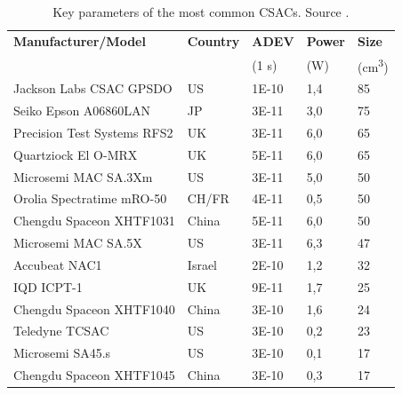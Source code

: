 \begin{table}[H]
    \centering
    \begin{tabular}{l|llll}
        \hline
        \textbf{Manufacturer/Model} & \textbf{Country} & \textbf{ADEV} & \textbf{Power} & \textbf{Size}           \\
        ~                           & ~                & (1 s)         & (W)            & (cm\textsuperscript{3}) \\
        \hline
        Jackson Labs CSAC GPSDO     & US               & 1E-10         & 1,4            & 85                      \\
        Seiko Epson A06860LAN       & JP               & 3E-11         & 3,0            & 75                      \\
        Precision Test Systems RFS2 & UK               & 3E-11         & 6,0            & 65                      \\
        Quartziock El O-MRX         & UK               & 5E-11         & 6,0            & 65                      \\
        Microsemi MAC SA.3Xm        & US               & 3E-11         & 5,0            & 50                      \\
        Orolia Spectratime mRO-50   & CH/FR            & 4E-11         & 0,5            & 50                      \\
        Chengdu Spaceon XHTF1031    & China            & 5E-11         & 6,0            & 50                      \\
        Microsemi MAC SA.5X         & US               & 3E-11         & 6,3            & 47                      \\
        Accubeat NAC1               & Israel           & 2E-10         & 1,2            & 32                      \\
        IQD ICPT-1                  & UK               & 9E-11         & 1,7            & 25                      \\
        Chengdu Spaceon XHTF1040    & China            & 3E-10         & 1,6            & 24                      \\
        Teledyne TCSAC              & US               & 3E-10         & 0,2            & 23                      \\
        Microsemi SA45.s            & US               & 3E-10         & 0,1            & 17                      \\
        Chengdu Spaceon XHTF1045    & China            & 3E-10         & 0,3            & 17                      \\
        \hline
    \end{tabular}
    \caption{Key parameters of the most common CSACs. Source \cite{Travagnin}.}
\end{table}

